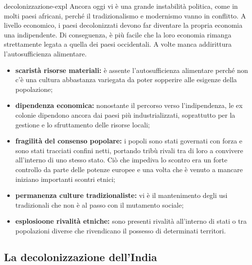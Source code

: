 \documentclass[preview]{standalone}
\begin{document}
\begin{snippet}{decolonizzazione-expl}
    Ancora oggi vi è una grande instabilità politica, come in molti paesi africani,
    perché il tradizionalismo e modernismo vanno in conflitto.
    A livello economico, i paesi decolonizzati
    devono far diventare la propria economia una indipendente.
    Di conseguenza, è più facile che la loro economia rimanga
    strettamente legata a quella dei paesi occidentali.
    A volte manca addirittura l'autosufficienza alimentare.
    \begin{itemize}
        \item \textbf{scaristà risorse materiali:}
            è assente l'autosufficienza alimentare perché non c'è
            una cultura abbastanza variegata da
            poter sopperire alle esigenze della popolazione;
        \item \textbf{dipendenza economica:}
            nonostante il percorso verso l'indipendenza, le ex colonie dipendono ancora dai paesi più
            industrializzati, soprattutto per la gestione e lo sfruttamento delle risorse locali;
        \item \textbf{fragilità del consenso popolare:}
            i popoli sono stati governati con forza e sono stati tracciati confini netti, portando tribù rivali
            tra di loro a convivere all'interno di uno stesso stato. Ciò che impediva lo scontro era un
            forte controllo da parte delle potenze europee e una volta che è venuto a mancare iniziano
            importanti scontri etnici;
        \item \textbf{permanenza culture tradizionaliste:}
            vi è il mantenimento degli usi tradizionali che non è al passo con il mutamento sociale;
        \item \textbf{esplosioone rivalità etniche:}
            sono presenti rivalità all'interno di stati o tra popolazioni diverse che rivendicano il possesso
            di determinati territori.
    \end{itemize}
\end{snippet}

\subsection{La decolonizzazione dell'India}
\end{document}
